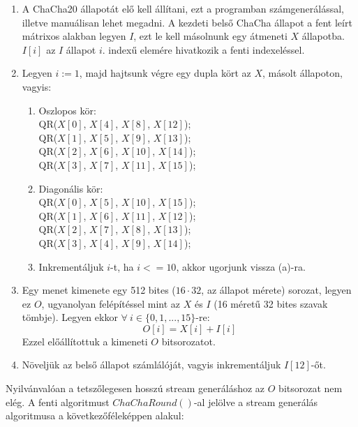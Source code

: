 \documentclass[hidelinks, 12pt]{article}
\begin{document}
	\begin{enumerate}
		\item A ChaCha20 állapotát elő kell állítani, ezt a programban számgenerálással, illetve manuálisan lehet megadni. A kezdeti belső ChaCha állapot a fent leírt mátrixos alakban legyen $I$, ezt le kell másolnunk egy átmeneti $X$ állapotba. $I[i]$ az $I$ állapot $i$. indexű elemére hivatkozik a fenti indexeléssel.
		\item Legyen $i := 1$, majd hajtsunk végre egy dupla kört az $X$, másolt állapoton, vagyis:
		\begin{enumerate}
			\item Oszlopos kör: \\
			QR($X[0]$, $X[4]$, $X[8]$, $X[12]$); \\
			QR($X[1]$, $X[5]$, $X[9]$, $X[13]$); \\
			QR($X[2]$, $X[6]$, $X[10]$, $X[14]$); \\
			QR($X[3]$, $X[7]$, $X[11]$, $X[15]$);
			\item Diagonális kör:
			\\QR($X[0]$, $X[5]$, $X[10]$, $X[15]$); \\
			QR($X[1]$, $X[6]$, $X[11]$, $X[12]$); \\
			QR($X[2]$, $X[7]$, $X[8]$, $X[13]$); \\
			QR($X[3]$, $X[4]$, $X[9]$, $X[14]$); \\
			\item Inkrementáljuk $i$-t, ha $i <= 10$, akkor ugorjunk vissza (a)-ra.
		\end{enumerate}
		\item Egy menet kimenete egy 512 bites ($16\cdot32$, az állapot mérete) sorozat, legyen ez $O$, ugyanolyan felépítéssel mint az $X$ és $I$ (16 méretű 32 bites szavak tömbje). Legyen ekkor $\forall \ i \in \{0, 1,..., 15\}$-re:
		$$O[i] = X[i] + I[i]$$
		Ezzel előállítottuk a kimeneti $O$ bitsorozatot.
		\item Növeljük az belső állapot számlálóját, vagyis inkrementáljuk $I[12]$-őt.
	\end{enumerate}
	Nyilvánvalóan a tetszőlegesen hosszú stream generáláshoz az $O$ bitsorozat nem elég. A fenti algoritmust $ChaChaRound()$-al jelölve a stream generálás algoritmusa a következőféleképpen alakul:
\end{document}
